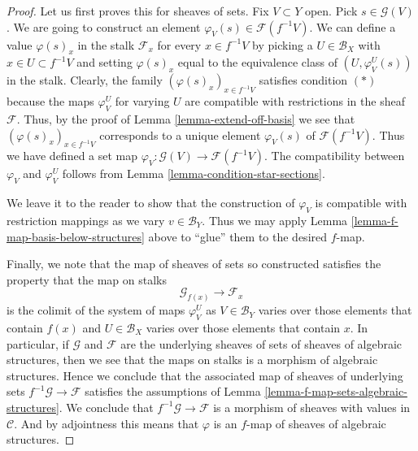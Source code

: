 \begin{proof}
Let us first proves this for sheaves of sets.
Fix $V \subset Y$ open. Pick $s \in \mathcal{G}(V)$.
We are going to construct an element
$\varphi_V(s) \in \mathcal{F}(f^{-1}V)$.
We can define a value $\varphi(s)_x$ in the stalk $\mathcal{F}_x$ 
for every $x \in f^{-1}V$ by picking a $U \in \mathcal{B}_X$
with $x \in U \subset f^{-1}V$ and setting $\varphi(s)_x$
equal to the equivalence class of $(U, \varphi_V^U(s))$
in the stalk. Clearly, the family $(\varphi(s)_x)_{x \in f^{-1}V}$
satisfies condition $(*)$ because the maps $\varphi_V^U$
for varying $U$
are compatible with restrictions in the sheaf $\mathcal{F}$.
Thus, by the proof of Lemma \ref{lemma-extend-off-basis}
we see that $(\varphi(s)_x)_{x \in f^{-1}V}$ corresponds
to a unique element $\varphi_V(s)$ of $\mathcal{F}(f^{-1}V)$.
Thus we have defined a set map
$\varphi_V : \mathcal{G}(V) \to \mathcal{F}(f^{-1}V)$.
The compatibility between $\varphi_V$ and $\varphi_V^U$
follows from Lemma \ref{lemma-condition-star-sections}.

\medskip\noindent
We leave it to the reader to show that the construction
of $\varphi_V$ is compatible with restriction mappings as we vary
$v \in \mathcal{B}_Y$. Thus we may apply Lemma
\ref{lemma-f-map-basis-below-structures} above to
``glue'' them to the desired $f$-map.

\medskip\noindent
Finally, we note that the map of sheaves of sets so constructed
satisfies the property that the map on stalks
$$
\mathcal{G}_{f(x)} \longrightarrow \mathcal{F}_x
$$
is the colimit of the system of maps $\varphi_V^U$ as
$V \in \mathcal{B}_Y$ varies over those elements that
contain $f(x)$ and $U \in \mathcal{B}_X$ varies over those elements that
contain $x$. In particular, if $\mathcal{G}$ and $\mathcal{F}$
are the underlying sheaves of sets of sheaves of algebraic structures,
then we see that the maps on stalks is a morphism of algebraic
structures. Hence we conclude that the associated map of
sheaves of underlying sets $f^{-1}\mathcal{G} \to \mathcal{F}$
satisfies the assumptions of
Lemma \ref{lemma-f-map-sets-algebraic-structures}.
We conclude that $f^{-1}\mathcal{G} \to \mathcal{F}$
is a morphism of sheaves with values in $\mathcal{C}$.
And by adjointness this means that $\varphi$ is
an $f$-map of sheaves of algebraic structures.
\end{proof}

